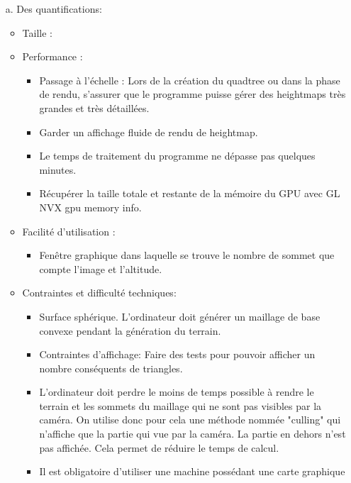 \documentclass[12pt]{report}
\begin{document}
\begin{enumerate}
            \item [\sffamily a.] Des quantifications:
                \begin{itemize}
                    \item Taille :
                    \item Performance : 
                    \begin{itemize}
                        \item Passage à l'échelle : Lors de la création du quadtree ou dans la phase de rendu, s'assurer que le programme puisse gérer des heightmaps très grandes et très détaillées.
                        \item Garder un affichage fluide de rendu de heightmap.
                        \item Le temps de traitement du programme ne dépasse pas quelques minutes.
                        \item Récupérer la taille totale et restante de la mémoire du GPU avec GL NVX gpu memory info.
                        \end{itemize}
                        \item Facilité d’utilisation : 
                        \begin{itemize}
                        \item Fenêtre graphique dans laquelle se trouve le nombre de sommet que compte l'image et l'altitude.
                    \end{itemize}
                    \item Contraintes et difficulté techniques:
                    \begin{itemize}
                        \item Surface sphérique. L'ordinateur doit générer un maillage de base convexe pendant la génération du terrain.
                        \item Contraintes d'affichage: Faire des tests pour pouvoir afficher un nombre conséquents de triangles.
                        \item L'ordinateur doit perdre le moins de temps possible à rendre le terrain et les sommets du maillage qui ne sont pas visibles par la caméra. On utilise donc pour cela une méthode nommée "culling" qui n'affiche que la partie qui vue par la caméra. La partie en dehors n'est pas affichée. Cela permet de réduire le temps de calcul.
                        \item Il est obligatoire d'utiliser une machine possédant une carte graphique 

\end{itemize}
\end{itemize}
\end{enumerate}
\end{document}
